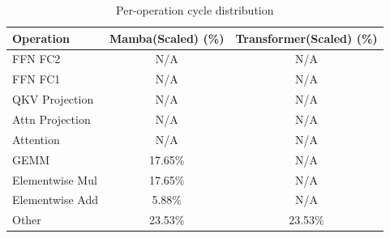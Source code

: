 \begin{table}[h]\centering
    \caption{Per-operation cycle distribution}
    \label{tab:layer_breakdown}
    \begin{tabular}{lcc}\hline
    Operation & Mamba(Scaled) (\%) & Transformer(Scaled) (\%) \\\hline
        FFN FC2 & N/A & N/A \\
    FFN FC1 & N/A & N/A \\
    QKV Projection & N/A & N/A \\
    Attn Projection & N/A & N/A \\
    Attention & N/A & N/A \\
    GEMM & 17.65\% & N/A \\
    Elementwise Mul & 17.65\% & N/A \\
    Elementwise Add & 5.88\% & N/A \\
    Other & 23.53\% & 23.53\% \\
\hline\end{tabular}\end{table}